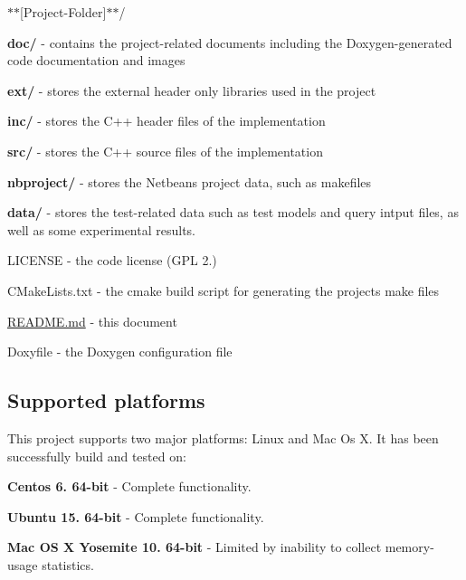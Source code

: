 \begin{DoxyItemize}
\item $\ast$$\ast${\ttfamily \mbox{[}Project-\/\+Folder\mbox{]}}$\ast$$\ast$/
\begin{DoxyItemize}
\item {\bfseries doc/} -\/ contains the project-\/related documents including the Doxygen-\/generated code documentation and images
\item {\bfseries ext/} -\/ stores the external header only libraries used in the project
\item {\bfseries inc/} -\/ stores the C++ header files of the implementation
\item {\bfseries src/} -\/ stores the C++ source files of the implementation
\item {\bfseries nbproject/} -\/ stores the Netbeans project data, such as makefiles
\item {\bfseries data/} -\/ stores the test-\/related data such as test models and query intput files, as well as some experimental results.
\item L\+I\+C\+E\+N\+S\+E -\/ the code license (G\+P\+L 2.)
\item C\+Make\+Lists.\+txt -\/ the cmake build script for generating the project\textquotesingle{}s make files
\item \hyperlink{_r_e_a_d_m_e_8md}{R\+E\+A\+D\+M\+E.\+md} -\/ this document
\item Doxyfile -\/ the Doxygen configuration file
\end{DoxyItemize}
\end{DoxyItemize}

\subsection*{Supported platforms}

This project supports two major platforms\+: Linux and Mac Os X. It has been successfully build and tested on\+:


\begin{DoxyItemize}
\item {\bfseries Centos 6. 64-\/bit} -\/ Complete functionality.
\item {\bfseries Ubuntu 15. 64-\/bit} -\/ Complete functionality.
\item {\bfseries Mac O\+S X Yosemite 10. 64-\/bit} -\/ Limited by inability to collect memory-\/usage statistics.
\end{DoxyItemize}

